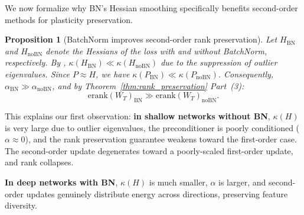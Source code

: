 \documentclass{article}
\newtheorem{proposition}[theorem]{Proposition}
\newcommand{\erank}{\mathrm{erank}}
\begin{document}
We now formalize why BN's Hessian smoothing specifically benefits second-order methods for plasticity preservation.

\begin{proposition}[BatchNorm improves second-order rank preservation]
\label{prop:bn_secondorder}
Let $H_{\mathrm{BN}}$ and $H_{\mathrm{noBN}}$ denote the Hessians of the loss with and without BatchNorm, respectively. By \citet{ghorbani2019investigation}, $\kappa(H_{\mathrm{BN}}) \ll \kappa(H_{\mathrm{noBN}})$ due to the suppression of outlier eigenvalues. Since $P \approx H$, we have $\kappa(P_{\mathrm{BN}}) \ll \kappa(P_{\mathrm{noBN}})$. Consequently, $\alpha_{\mathrm{BN}} \gg \alpha_{\mathrm{noBN}}$, and by Theorem~\ref{thm:rank_preservation} Part~(3):
\[
\erank(W_T)_{\mathrm{BN}} \gg \erank(W_T)_{\mathrm{noBN}}.
\]
\end{proposition}

This explains our first observation: \textbf{in shallow networks without BN}, $\kappa(H)$ is very large due to outlier eigenvalues, the preconditioner is poorly conditioned ($\alpha \approx 0$), and the rank preservation guarantee weakens toward the first-order case. The second-order update degenerates toward a poorly-scaled first-order update, and rank collapses.

\textbf{In deep networks with BN}, $\kappa(H)$ is much smaller, $\alpha$ is larger, and second-order updates genuinely distribute energy across directions, preserving feature diversity.
\end{document}
